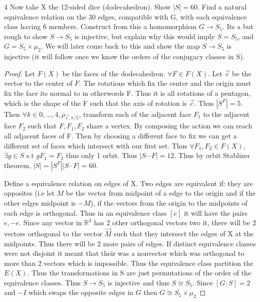 \documentclass{article}
\newcommand{\R}{\mathbb{R}}
\begin{document}
\bigskip

\begin{PROB}{4}\label{Problem 4.}
    Now take X the 12-sided dice (dodecahedron). Show $|S| = 60$.  Find a natural equivalence relation on the 30 edges, compatible with G, with each equivalence class having 6 members.  Construct from this a homomorphism $G \to S_5$. Its a but rough to show $S \to S_5$ is injective, but explain why this would imply $S = S_5$, and $G = S_5 \times \mu_2$.  We will later come back to this and show the map $S \to S_5$ is injective (it will follow once we know the orders of the conjugacy classes in S). 
\end{PROB}
\begin{proof}
    Let $F(X)$ be the faces of the dodecahedron. $\forall F \in F(X)$. Let $\vec{c}$ be the vector to the center of $F$. The rotations which fix the center and the origin must fix the face its normal to in otherwords F. Thus it is all rotations of a pentagon, which is the shape of the F such that the axis of rotation is $\vec{c}$. Thus $|S^F| = 5$. Then $\forall k \in 0, \ldots, 4, \rho_{\vec{c}, \pi/5}$, transform each of the adjacent face $F_1$ to the adjacent face $F_2$ such that $F, F_1, F_2$ share a vertex. By composing the action we can reach all adjacent faces of F. Then by choosing a different face to fix we can get a different set of faces which intersect with our first set. Thus $\forall F_1, F_2 \in F(X)$, $\exists g \in S$ s.t $gF_1 = F_2$ thus only 1 orbit. Thus $|S \cdots F| = 12$. Thus by orbit Stablizer theorem, $|S| = |S^F||S \cdot F| = 60$. 


    Define a equivalence relation on edges of X. Two edges are equivalent if: they are opposites (i.e let $M$ be the vector from midpoint of a edge to the origin and if the other edges midpoint is $-M$), if the vectors from the origin to the midpoints of each edge is orthogonal. Thus in an equivalence class $[e]$ it will have the pairs $e, -e$. Since any vector in $\R^3$ has 2 other orthogonal vectors two it, there will be $2$ vectors orthogonal to the vector $\vec{M}$ such that they intersect the edges of X at the midpoints. Thus there will be 2 more pairs of edges. If distinct equivalence classes were not disjoint it meant that their was a nonvector which was orthogonal to more than 2 vectors which is impossible. Thus the equivalence class partition the $E(X)$. Thus the transformations in S are just permutations of the order of the equivalence classes. Thus $S \to S_5$ is injective and thus $S \cong S_5$. Since $[G : S] = 2$ and $-I$ which swaps the opposite edges in $G$ then $G \cong S_5 \times \mu_2$
\end{proof}
\end{document}
